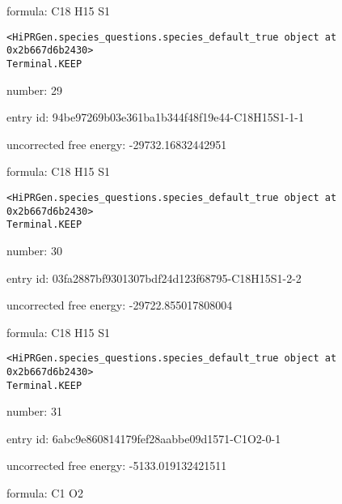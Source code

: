 \documentclass{article}
\begin{document}
formula: C18 H15 S1


\vspace{1cm}
\begin{verbatim}
<HiPRGen.species_questions.species_default_true object at 0x2b667d6b2430>
Terminal.KEEP
\end{verbatim}


number: 29



entry id: 94be97269b03e361ba1b344f48f19e44-C18H15S1-1-1



uncorrected free energy: -29732.16832442951



formula: C18 H15 S1


\vspace{1cm}
\begin{verbatim}
<HiPRGen.species_questions.species_default_true object at 0x2b667d6b2430>
Terminal.KEEP
\end{verbatim}


number: 30



entry id: 03fa2887bf9301307bdf24d123f68795-C18H15S1-2-2



uncorrected free energy: -29722.855017808004



formula: C18 H15 S1


\vspace{1cm}
\begin{verbatim}
<HiPRGen.species_questions.species_default_true object at 0x2b667d6b2430>
Terminal.KEEP
\end{verbatim}


number: 31



entry id: 6abc9e860814179fef28aabbe09d1571-C1O2-0-1



uncorrected free energy: -5133.019132421511



formula: C1 O2

\end{document}
